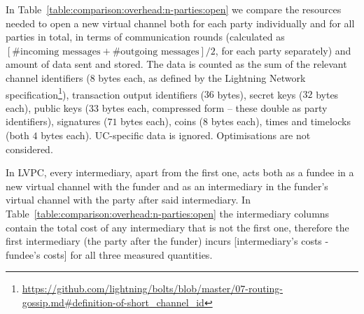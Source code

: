   In Table~\ref{table:comparison:overhead:n-parties:open} we compare the
  resources needed to open a new virtual channel both for each party
  individually and for all parties in total, in terms of communication rounds
  (calculated as $[\#\text{incoming messages} + \#\text{outgoing messages}]/2$,
  for each party separately) and amount of data sent and stored. The data is
  counted as the sum of the relevant channel identifiers ($8$ bytes each, as
  defined by the Lightning Network
  specification\footnote{\url{https://github.com/lightning/bolts/blob/master/07-routing-gossip.md\#definition-of-short_channel_id}}),
  transaction output identifiers ($36$ bytes), secret keys ($32$ bytes each),
  public keys ($33$ bytes each, compressed form -- these double as party
  identifiers), signatures ($71$ bytes each), coins ($8$ bytes each), times and
  timelocks (both $4$ bytes each). UC-specific data is ignored.   Optimisations are not
  considered.

  In LVPC, every intermediary, apart from the first one, acts both as a fundee
  in a new virtual channel with the funder and as an intermediary in the
  funder's virtual channel with the party after said intermediary. In
  Table~\ref{table:comparison:overhead:n-parties:open} the intermediary columns
  contain the total cost of any intermediary that is not the first one,
  therefore the first intermediary (the party after the funder) incurs
  [intermediary's costs - fundee's costs] for all three measured quantities.

